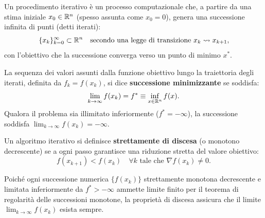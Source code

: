 \begin{definition}
Un procedimento iterativo \`e un processo computazionale che, a partire da una stima iniziale $x_0 \in \mathbb{R}^n$ (spesso assunta come $x_0 = 0$), genera una successione infinita di punti (detti iterati):
\begin{equation}
    \{x_k\}_{k=0}^\infty \subset \mathbb{R}^n \quad \text{secondo una legge di transizione } x_k \rightsquigarrow x_{k+1},
\end{equation}
con l'obiettivo che la successione converga verso un punto di minimo $x^*$.
\end{definition}

\begin{definition}
La sequenza dei valori assunti dalla funzione obiettivo lungo la traiettoria degli iterati, definita da $f_k = f(x_k)$, si dice \textbf{successione minimizzante} se soddisfa:
\begin{equation}
    \lim_{k \to \infty} f(x_k) = f^* \equiv \inf_{x \in \mathbb{R}^n} f(x).
\end{equation}
Qualora il problema sia illimitato inferiormente ($f^* = -\infty$), la successione soddisfa $\lim_{k \to \infty} f(x_k) = -\infty$.
\end{definition}

\begin{definition}
Un algoritmo iterativo si definisce \textbf{strettamente di discesa} (o monotono decrescente) se a ogni passo garantisce una riduzione stretta del valore obiettivo:
\begin{equation}
    f(x_{k+1}) < f(x_k) \quad \forall k \text{ tale che } \nabla f(x_k) \neq 0.
\end{equation}
\end{definition}

\begin{proposition}
Poich\'e ogni successione numerica $\{f(x_k)\}$ strettamente monotona decrescente e limitata inferiormente da $f^* > -\infty$ ammette limite finito per il teorema di regolarit\`a delle successioni monotone, la propriet\`a di discesa assicura che il limite $\lim_{k \to \infty} f(x_k)$ esista sempre.
\end{proposition}

